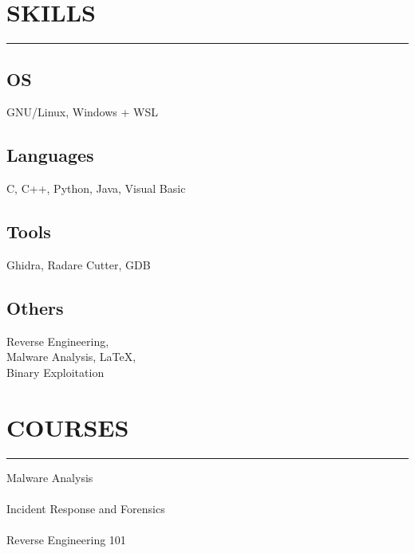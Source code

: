 \documentclass[]{resume}
\begin{document}
\begin{minipage}[t]{0.33\textwidth}

    \section{SKILLS}
    \noindent\rule{5cm}{0.4pt}

    \subsection{OS}
    \noindent GNU/Linux, Windows + WSL

    \vspace{6pt}
    \subsection{Languages}
    \noindent C, C++, Python, Java, Visual Basic

    \vspace{6pt}
    \subsection{Tools}
    \noindent Ghidra, Radare Cutter, GDB

    \vspace{6pt}
    \subsection{Others}
    \noindent Reverse Engineering,\\
    Malware Analysis, LaTeX,\\
    Binary Exploitation


    \section{COURSES}
    \noindent\rule{5cm}{0.4pt}

    \noindent Malware Analysis\\
    \noindent {}\\

    \vspace{6pt}
    \noindent Incident Response and Forensics\\
    \noindent {}\\

    \vspace{6pt}
    \noindent Reverse Engineering 101\\
    \noindent {}\\

\end{minipage}
\end{document}
